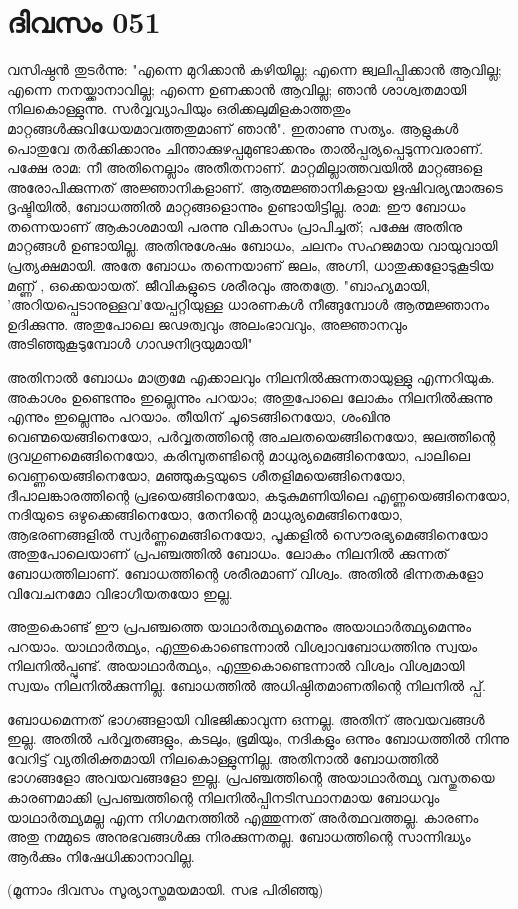  
\section{ദിവസം 051}


വസിഷ്ഠന്‍ തുടര്‍ന്നു: "എന്നെ മുറിക്കാന്‍ കഴിയില്ല; എന്നെ ജ്വലിപ്പിക്കാന്‍ ആവില്ല; എന്നെ നനയ്ക്കാനാവില്ല; എന്നെ ഉണക്കാന്‍ ആവില്ല; ഞാന്‍ ശാശ്വതമായി നിലകൊള്ളുന്നു. സര്‍വ്വവ്യാപിയും ഒരിക്കലുമിളകാത്തതും മാറ്റങ്ങള്‍ക്കുവിധേയമാവത്തതുമാണ്‌ ഞാന്‍". ഇതാണു സത്യം. ആളുകള്‍ പൊതുവേ തര്‍ക്കിക്കാനും ചിന്താക്കുഴപ്പമുണ്ടാക്കനും താല്‍പ്പര്യപ്പെടുന്നവരാണ്‌. പക്ഷേ രാമ: നീ അതിനെല്ലാം അതീതനാണ്‌. മാറ്റമില്ലാത്തവയില്‍ മാറ്റങ്ങളെ അരോപിക്കുന്നത്‌ അജ്ഞാനികളാണ്‌. ആത്മജ്ഞാനികളായ ഋഷിവര്യന്മാരുടെ ദൃഷ്ടിയില്‍, ബോധത്തില്‍ മാറ്റങ്ങളൊന്നും ഉണ്ടായിട്ടില്ല. രാമ: ഈ ബോധം തന്നെയാണ്‌ ആകാശമായി പരന്നു വികാസം പ്രാപിച്ചത്‌; പക്ഷേ അതിനു മാറ്റങ്ങള്‍ ഉണ്ടായില്ല. അതിനുശേഷം ബോധം, ചലനം സഹജമായ വായുവായി പ്രത്യക്ഷമായി. അതേ ബോധം തന്നെയാണ്‌ ജലം, അഗ്നി, ധാതുക്കളോടുകൂടിയ മണ്ണ്‌ , ഒക്കെയായത്‌. ജീവികളുടെ ശരീരവും അതത്രേ. "ബാഹ്യമായി, 'അറിയപ്പെടാനുള്ളവ'യേപ്പറ്റിയുള്ള ധാരണകള്‍ നീങ്ങുമ്പോള്‍ ആത്മജ്ഞാനം ഉദിക്കുന്നു. അതുപോലെ ജഢത്വവും അലംഭാവവും, അജ്ഞാനവും അടിഞ്ഞുകൂടുമ്പോള്‍ ഗാഢനിദ്രയുമായി"

അതിനാല്‍ ബോധം മാത്രമേ എക്കാലവും നിലനില്‍ക്കുന്നതായുള്ളു എന്നറിയുക. അകാശം ഉണ്ടെന്നും ഇല്ലെന്നും പറയാം; അതുപോലെ ലോകം നിലനില്‍ക്കുന്നു എന്നും ഇല്ലെന്നും പറയാം. തീയിന്‌ ചൂടെങ്ങിനെയോ, ശംഖിനു വെണ്മയെങ്ങിനെയോ, പര്‍വ്വതത്തിന്റെ അചലതയെങ്ങിനെയോ, ജലത്തിന്റെ ദ്രവഗുണമെങ്ങിനെയോ, കരിമ്പുതണ്ടിന്റെ മാധുര്യമെങ്ങിനെയോ, പാലിലെ വെണ്ണയെങ്ങിനെയോ, മഞ്ഞുകട്ടയുടെ ശീതളിമയെങ്ങിനെയോ, ദീപാലങ്കാരത്തിന്റെ പ്രഭയെങ്ങിനെയോ, കടുകുമണിയിലെ എണ്ണയെങ്ങിനെയോ, നദിയുടെ ഒഴുക്കെങ്ങിനെയോ, തേനിന്റെ മാധുര്യമെങ്ങിനെയോ, ആഭരണങ്ങളില്‍ സ്വര്‍ണ്ണമെങ്ങിനെയോ, പൂക്കളില്‍ സൌരഭ്യമെങ്ങിനെയോ അതുപോലെയാണ്‌ പ്രപഞ്ചത്തില്‍ ബോധം. ലോകം നിലനില്‍ ക്കുന്നത്‌ ബോധത്തിലാണ്‌. ബോധത്തിന്റെ ശരീരമാണ്‌ വിശ്വം. അതില്‍ ഭിന്നതകളോ വിവേചനമോ വിഭാഗീയതയോ ഇല്ല.

അതുകൊണ്ട്‌ ഈ പ്രപഞ്ചത്തെ യാഥാര്‍ത്ഥ്യമെന്നും അയാഥാര്‍ത്ഥ്യമെന്നും പറയാം. യാഥാര്‍ത്ഥ്യം, എന്തുകൊണ്ടെന്നാല്‍ വിശ്വാവബോധത്തിനു സ്വയം നിലനില്‍പ്പുണ്ട്‌. അയാഥാര്‍ത്ഥ്യം, എന്തുകൊണ്ടെന്നാല്‍ വിശ്വം വിശ്വമായി സ്വയം നിലനില്‍ക്കുന്നില്ല. ബോധത്തില്‍ അധിഷ്ഠിതമാണതിന്റെ നിലനില്‍ പ്പ്‌.   

ബോധമെന്നത്‌ ഭാഗങ്ങളായി വിഭജിക്കാവുന്ന ഒന്നല്ല. അതിന്‌ അവയവങ്ങള്‍ ഇല്ല. അതില്‍ പര്‍വ്വതങ്ങളും, കടലും, ഭൂമിയും, നദികളും ഒന്നും ബോധത്തില്‍ നിന്നു വേറിട്ട്‌ വ്യതിരിക്തമായി നിലകൊള്ളുന്നില്ല. അതിനാല്‍ ബോധത്തില്‍ ഭാഗങ്ങളോ അവയവങ്ങളോ ഇല്ല. പ്രപഞ്ചത്തിന്റെ അയാഥാര്‍ത്ഥ്യ വസ്തുതയെ കാരണമാക്കി പ്രപഞ്ചത്തിന്റെ നിലനില്‍പ്പിനടിസ്ഥാനമായ ബോധവും യാഥാര്‍ത്ഥ്യമല്ല എന്ന നിഗമനത്തില്‍ എത്തുന്നത്‌ അര്‍ത്ഥവത്തല്ല. കാരണം അതു നമ്മുടെ അനുഭവങ്ങള്‍ക്കു നിരക്കുന്നതല്ല. ബോധത്തിന്റെ സാന്നിദ്ധ്യം ആര്‍ക്കും നിഷേധിക്കാനാവില്ല.

(മൂന്നാം ദിവസം സൂര്യാസ്തമയമായി. സഭ പിരിഞ്ഞു)

